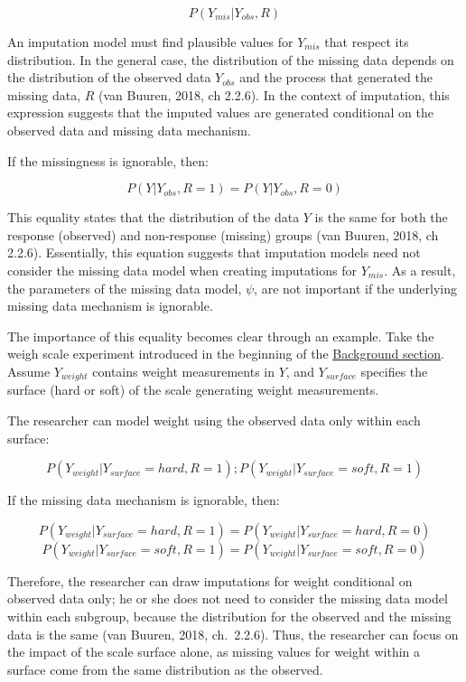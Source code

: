 \documentclass[12pt,oneside]{chicagocapstone}
\begin{document}
\[P(Y_{mis}|Y_{obs}, R)\]

An imputation model must find plausible values for \(Y_{mis}\) that
respect its distribution. In the general case, the distribution of the
missing data depends on the distribution of the observed data
\(Y_{obs}\) and the process that generated the missing data, \(R\) (van
Buuren, 2018, ch 2.2.6). In the context of imputation, this expression
suggests that the imputed values are generated conditional on the
observed data and missing data mechanism.

If the missingness is ignorable, then:

\[P(Y|Y_{obs}, R=1) = P(Y|Y_{obs}, R=0)\]

This equality states that the distribution of the data \(Y\) is the same
for both the response (observed) and non-response (missing) groups (van
Buuren, 2018, ch 2.2.6). Essentially, this equation suggests that
imputation models need not consider the missing data model when creating
imputations for \(Y_{mis}\). As a result, the parameters of the missing
data model, \(\psi\), are not important if the underlying missing data
mechanism is ignorable.

The importance of this equality becomes clear through an example. Take
the weigh scale experiment introduced in the beginning of the
\protect\hyperlink{background}{Background section}. Assume
\(Y_{weight}\) contains weight measurements in \(Y\), and
\(Y_{surface}\) specifies the surface (hard or soft) of the scale
generating weight measurements.

The researcher can model weight using the observed data only within each
surface:

\[P(Y_{weight}|Y_{surface}=hard, R=1) ; P(Y_{weight}|Y_{surface}=soft, R=1)\]

If the missing data mechanism is ignorable, then:

\[P(Y_{weight}|Y_{surface}=hard, R=1) = P(Y_{weight}|Y_{surface}=hard, R=0)\]
\[P(Y_{weight}|Y_{surface}=soft, R=1) = P(Y_{weight}|Y_{surface}=soft, R=0)\]

Therefore, the researcher can draw imputations for weight conditional on
observed data only; he or she does not need to consider the missing data
model within each subgroup, because the distribution for the observed
and the missing data is the same (van Buuren, 2018, ch.~2.2.6). Thus,
the researcher can focus on the impact of the scale surface alone, as
missing values for weight within a surface come from the same
distribution as the observed.
\end{document}

